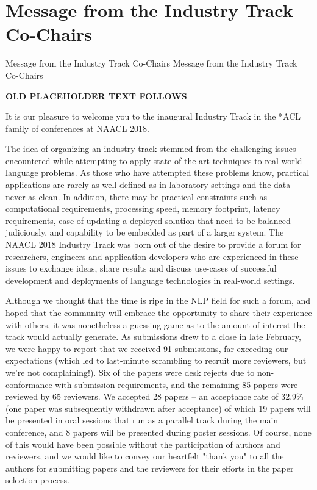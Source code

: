 \vspace{2em}

\section{Message from the Industry Track Co-Chairs}\vspace{2em}
\setheaders%
    {Message from the Industry Track Co-Chairs}%
    {Message from the Industry Track Co-Chairs}
\thispagestyle{emptyheader}

\setlength{\parskip}{1ex}

\textbf{OLD PLACEHOLDER TEXT FOLLOWS}

It is our pleasure to welcome you to the inaugural Industry Track in the *ACL family of conferences at NAACL 2018. 

The idea of organizing an industry track stemmed from the challenging issues encountered while attempting to apply state-of-the-art techniques to real-world language problems. As those who have attempted these problems know, practical applications are rarely as well defined as in laboratory settings and the data never as clean. In addition, there may be practical constraints such as computational requirements, processing speed, memory footprint, latency requirements, ease of updating a deployed solution that need to be balanced judiciously, and capability to be embedded as part of a larger system. The NAACL 2018 Industry Track was born out of the desire to provide a forum for researchers, engineers and application developers who are experienced in these issues to exchange ideas, share results and discuss use-cases of successful development and deployments of language technologies in real-world settings. 

Although we thought that the time is ripe in the NLP field for such a forum, and hoped that the community will embrace the opportunity to share their experience with others, it was nonetheless a guessing game as to the amount of interest the track would actually generate. As submissions drew to a close in late February, we were happy to report that we received 91 submissions, far exceeding our expectations (which led to last-minute scrambling to recruit more reviewers, but we're not complaining!). Six of the papers were desk rejects due to non-conformance with submission requirements, and the remaining 85 papers were reviewed by 65 reviewers. We accepted 28 papers -- an acceptance rate of 32.9\% (one paper was subsequently withdrawn after acceptance) of which 19 papers will be presented in oral sessions that run as a parallel track during the main conference, and 8 papers will be presented during poster sessions. Of course, none of this would have been possible without the participation of authors and reviewers, and we would like to convey our heartfelt "thank you" to all the authors for submitting papers and the reviewers for their efforts in the paper selection process.


